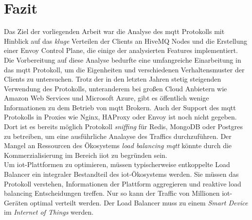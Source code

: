 \section{Fazit}
Das Ziel der vorliegenden Arbeit war die Analyse des \ac{mqtt} Protokolls mit Hinblick auf das \textit{kluge} Verteilen der Clients an HiveMQ Nodes und die Erstellung einer Envoy Control Plane, die einige der analysierten Features implementiert.
\\
Die Vorbereitung auf diese Analyse bedurfte eine umfangreiche Einarbeitung in das \ac{mqtt} Protokoll, um die Eigenheiten und verschiedenen Verhaltensmuster der Clients zu untersuchen.
Trotz der in den letzten Jahren stetig steigenden Verwendung des Protokolls, unteranderem bei gro{\ss}en Cloud Anbietern wie Amazon Web Services und Microsoft Azure, gibt es öffentlich wenige Informationen zu dem Betrieb von \ac{mqtt} Brokern.
Auch der Support des \ac{mqtt} Protokolls in Proxies wie Nginx, HAProxy oder Envoy ist noch nicht gegeben. Dort ist es bereits möglich Protokoll \textit{sniffing} für Redis, MongoDB oder Postgres zu betreiben, um eine ausführliche Analayse des Traffics durchzuführen.
Der Mangel an Ressourcen des Ökosystems \textit{load balancing \ac{mqtt}} könnte durch die Kommerzialisierung im Bereich \ac{iiot} zu begründen sein.
\\
Um \ac{iot}-Plattformen zu optimieren, müssen typischerweise entkoppelte Load Balancer ein integraler Bestandteil des \ac{iot}-Ökosystems werden. Sie müssen das Protokoll verstehen, Informationen der Plattform aggregieren und reaktive load balancing Entscheidungen treffen.
Nur so kann der Traffic von Millionen \ac{iot}-Geräten optimal verteilt werden.
Der Load Balancer muss zu einem \textit{Smart Device} im \textit{Internet of Things} werden.
\newpage

